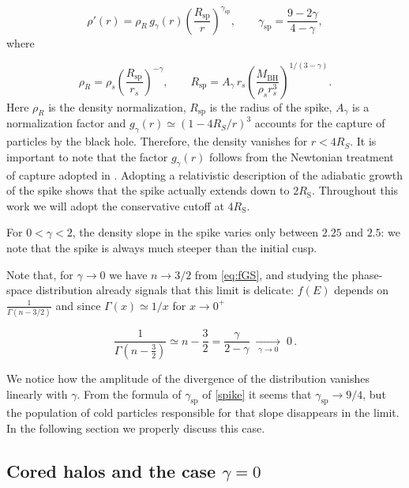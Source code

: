 \begin{equation} \label{spike}
\rho'(r)
=
\rho_R \, g_\gamma(r)
\left( \frac{R_{\mathrm{sp}}}{r} \right)^{\gamma_{\mathrm{sp}}},
\qquad
\gamma_{\mathrm{sp}} = \frac{9-2\gamma}{4-\gamma},
\end{equation}
where

\begin{equation} \label{r_spike}
\rho_R = \rho_s \left( \frac{R_{\mathrm{sp}}}{r_s} \right)^{-\gamma},
\qquad
R_{\mathrm{sp}} = A_\gamma \, r_s
\left( \frac{M_{\mathrm{BH}}}{\rho_s r_s^3} \right)^{1/(3-\gamma)}.
\end{equation}
Here $\rho_R$ is the density normalization, $R_{\mathrm{sp}}$ is the radius of
the spike, $A_\gamma$ is a normalization factor and
$g_\gamma(r) \simeq (1-4R_S/r)^3$ accounts for the capture of particles by the
black hole. Therefore, the density vanishes for $r < 4R_S$. It is important to
note that the factor $g_\gamma(r)$ follows from the Newtonian treatment of
capture adopted in \cite{Gondolo_1999}. Adopting a relativistic description of
the adiabatic growth of the spike \cite{Sadeghian_2013} shows that the spike
actually extends down to $2R_{\mathrm{S}}$. Throughout this work we will adopt
the conservative cutoff at $4R_{\mathrm{S}}$.

For $0 < \gamma < 2$, the density slope in the spike varies only between
$2.25$ and $2.5$: we note that the spike is always much steeper than the initial cusp.


Note that, for $\gamma \to 0$ we have $n \to 3/2$ from \cref{eq:fGS}, 
and studying the phase-space distribution already signals that
this limit is delicate: $f(E)$ depends on $\frac{1}{\Gamma(n-3/2)}$ and
since $\Gamma(x) \simeq 1/x$ for $x \to 0^{+}$

\begin{equation}
\frac{1}{\Gamma\!\left(n-\tfrac{3}{2}\right)}
\simeq n - \frac{3}{2}
= \frac{\gamma}{2-\gamma}
\;\xrightarrow[\;\gamma \to 0\;]{}\; 0 \,.
\end{equation}

We notice how the amplitude of the divergence of the distribution vanishes
linearly with $\gamma$.
From the formula of $\gamma_{\mathrm{sp}}$ of \cref{spike} it seems that 
$\gamma_{\mathrm{sp}} \to 9/4$, but the population of cold particles
responsible for that slope disappears in the limit.
In the following section we properly discuss this case.




\subsection{Cored halos and the case $\gamma = 0$}
\label{sec:gamma0}



